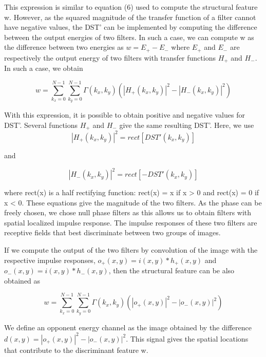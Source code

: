 \documentclass{article}
\begin{document}
This expression is similar to equation (6) used to compute the structural feature w. However, as the squared magnitude of the transfer function of a filter cannot have negative values, the DST' can be implemented by computing the difference between the output energies of two filters.
In such a case, we can compute w as the difference between two energies as $w = E_{+}- E_{-}$ where $E_{+}$ and $ E_{-}$  are respectively the output energy of two filters with transfer functions  $H_{+}$ and $ H_{-}$. In such a case, we obtain

\begin{equation}
   w = \sum^{N-1}_{k_x=0} \sum^{N-1}_{k_y=0} \Gamma(k_x,k_y)(|H_{+}(k_x,k_y)|^2-|H_{-}(k_x,k_y)|^2)
\end{equation}

With this expression, it is possible to obtain positive and negative values for DST'. Several functions $H_{+}$ and $ H_{-}$ give the same resulting DST'. Here, we use
\begin{equation}
    |H_{+}(k_x,k_y)|^2 = rect[DST'(k_x,k_y)]
\end{equation}

and

\begin{equation}
    |H_{-}(k_x,k_y)|^2 = rect[-DST'(k_x,k_y)]
\end{equation}

where rect(x) is a half rectifying function: rect(x) = x if x > 0 and rect(x) = 0 if x < 0.
These equations give the magnitude of the two filters. As the phase can be freely chosen, we chose null phase filters as this allows us to obtain filters with spatial localized impulse response. The impulse responses of these two filters are receptive fields that best discriminate between two groups of images.

If we compute the output of the two filters by convolution of the image with the respective impulse responses, $o_{+}(x,y)=i(x,y)*h_{+}(x,y) $ and $o_{-}(x,y)=i(x,y)*h_{-}(x,y)$, then the structural feature can be also obtained as

\begin{equation}
   w = \sum^{N-1}_{k_x=0} \sum^{N-1}_{k_y=0} \Gamma(k_x,k_y)(|o_{+}(x,y)|^2-|o_{-}(x,y)|^2)
\end{equation}

We define an opponent energy channel as the image obtained by the difference $d(x, y) = |o_{+}(x, y)|^2 - |o_{-}(x, y)|^2$. This signal gives the spatial locations that contribute to the
discriminant feature w.
\end{document}
